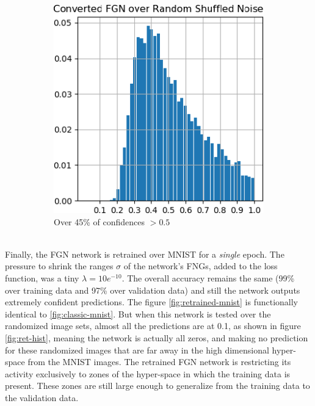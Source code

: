 \documentclass[12pt,oneside]{CUNY_PhD}
\begin{document}
\begin{figure}[!htbp]
\begin{subfigure}[t]{0.49\textwidth}
        \includegraphics[width=\textwidth]{images/mnist-behavior/converted-hist-shuffled.png}
        \caption*{Over 45\% of confidences $>0.5$}
    \end{subfigure}
    \caption{}
    \label{fig:converted-hist}
\end{figure}\\
\indent Finally, the FGN network is retrained over MNIST for a \emph{single} epoch. The pressure to shrink the ranges $\sigma$ of the network's FNGs, added to the loss function, was a tiny $\lambda=10e^{-10}$. The overall accuracy remains the same (99\% over training data and 97\% over validation data) and still the network outputs extremely confident predictions. The figure \ref{fig:retrained-mnist} is functionally identical to \ref{fig:classic-mnist}. But when this network is tested over the randomized image sets, almost all the predictions are at 0.1, as shown in figure \ref{fig:ret-hist}, meaning the network is actually all zeros, and making no prediction for these randomized images that are far away in the high dimensional hyper-space from the MNIST images. The retrained FGN network is restricting its activity exclusively to zones of the hyper-space in which the training data is present. These zones are still large enough to generalize from the training data to the validation data.
\end{document}
